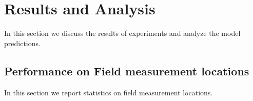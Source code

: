 \documentclass{article} %
\begin{document}
\section{Results and Analysis}
In this section we discuss the results of experiments and analyze the model predictions. %
\subsection{Performance on Field measurement locations}
In this section we report statistics on field measurement locations.
\end{document}

